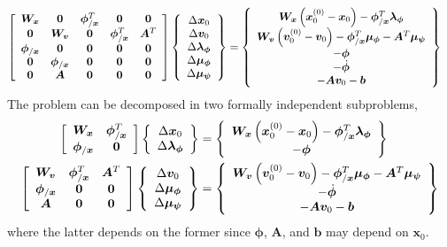 \documentclass[10pt,dvips,fleqn,subeqn]{report}
\newcommand{\T}[1]{\bm{#1}}
\newcommand{\TT}[1]{\bm{#1}}
\begin{document}
\begin{align}
	\sqbr{\matr{ccccc}{
		\TT{W}_{\T{x}} & \TT{0} & \T{\phi}_{/\T{x}}^T & \TT{0} & \TT{0}
		\\
		\TT{0} & \TT{W}_{\T{v}} & \TT{0} & \T{\phi}_{/\T{x}}^T & \TT{A}^T
		\\
		\T{\phi}_{/\T{x}} & \TT{0} & \TT{0} & \TT{0} & \TT{0}
		\\
		\TT{0} & \T{\phi}_{/\T{x}} & \TT{0} & \TT{0} & \TT{0}
		\\
		\TT{0} & \TT{A} & \TT{0} & \TT{0} & \TT{0}
	}}
	\cubr{\cvvect{
		\Delta\T{x}_0
		\\
		\Delta\T{v}_0
		\\
		\Delta\T{\lambda}_{\T{\phi}}
		\\
		\Delta\T{\mu}_{\T{\phi}}
		\\
		\Delta\T{\mu}_{\T{\psi}}
	}}
	&=
	\cubr{\cvvect{
		\TT{W}_{\T{x}} \plbr{\T{x}_0^{(0)} - \T{x}_0} - \T{\phi}_{/\T{x}}^T \T{\lambda}_{\T{\phi}}
		\\
		\TT{W}_{\T{v}} \plbr{\T{v}_0^{(0)} - \T{v}_0} - \T{\phi}_{/\T{x}}^T \T{\mu}_{\T{\phi}} - \TT{A}^T \T{\mu}_{\T{\psi}}
		\\
		-\T{\phi}
		\\
		-\dot{\T{\phi}}
		\\
		-\TT{A} \T{v}_0 - \T{b}
	}}
\end{align}
The problem can be decomposed in two formally independent subproblems,
\begin{align}
	\sqbr{\matr{ccc}{
		\TT{W}_{\T{x}} & \T{\phi}_{/\T{x}}^T
		\\
		\T{\phi}_{/\T{x}} & \TT{0}
	}}
	\cubr{\cvvect{
		\Delta\T{x}_0
		\\
		\Delta\T{\lambda}_{\T{\phi}}
	}}
	&=
	\cubr{\cvvect{
		\TT{W}_{\T{x}} \plbr{\T{x}_0^{(0)} - \T{x}_0} - \T{\phi}_{/\T{x}}^T \T{\lambda}_{\T{\phi}}
		\\
		-\T{\phi}
	}}
	\\
	\sqbr{\matr{ccc}{
		\TT{W}_{\T{v}} & \T{\phi}_{/\T{x}}^T & \TT{A}^T
		\\
		\T{\phi}_{/\T{x}} & \TT{0} & \TT{0}
		\\
		\TT{A} & \TT{0} & \TT{0}
	}}
	\cubr{\cvvect{
		\Delta\T{v}_0
		\\
		\Delta\T{\mu}_{\T{\phi}}
		\\
		\Delta\T{\mu}_{\T{\psi}}
	}}
	&=
	\cubr{\cvvect{
		\TT{W}_{\T{v}} \plbr{\T{v}_0^{(0)} - \T{v}_0} - \T{\phi}_{/\T{x}}^T \T{\mu}_{\T{\phi}} - \TT{A}^T \T{\mu}_{\T{\psi}}
		\\
		-\dot{\T{\phi}}
		\\
		-\TT{A} \T{v}_0 - \T{b}
	}}
\end{align}
where the latter depends on the former since $\T{\phi}$, $\TT{A}$, and $\T{b}$ may depend on $\T{x}_0$.
\end{document}

